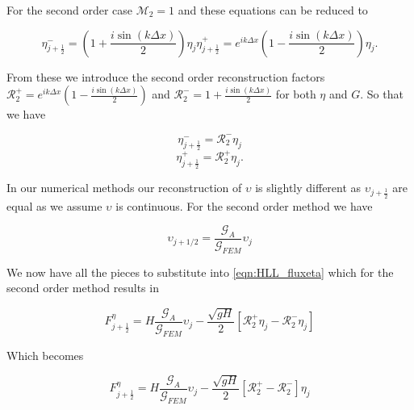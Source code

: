 \documentclass[12pt]{article}
\begin{document}
For the second order case $\mathcal{M}_2 = 1$ and these equations can be reduced to 

\begin{subequations}
	\label{eqn:2ndrecon}
	\begin{equation}
	\eta^-_{j+\frac{1}{2}} = \left(1  + \frac{i\sin\left(k\Delta x\right)}{2} \right){\eta}_j
	\end{equation}
	\begin{equation}
	\eta^+_{j+\frac{1}{2}} = e^{ik\Delta x}\left(1  - \frac{i\sin\left(k\Delta x\right)}{2} \right){\eta}_{j}.
	\end{equation}
\end{subequations}

From these we introduce the second order reconstruction factors $\mathcal{R}^+_2 = e^{ik\Delta x}\left(1  - \frac{i\sin\left(k\Delta x\right)}{2} \right)$ and $\mathcal{R}^-_2 = 1  + \frac{i\sin\left(k\Delta x\right)}{2}$ for both $\eta$ and $G$. So that we have 

\begin{equation*}
\eta^-_{j+\frac{1}{2}} = \mathcal{R}^-_2 {\eta}_j
\end{equation*}
\begin{equation*}
\eta^+_{j+\frac{1}{2}} = \mathcal{R}^+_2{\eta}_{j}.
\end{equation*}

In our numerical methods our reconstruction of $\upsilon$ is slightly different as $\upsilon_{j+\frac{1}{2}}$ are equal as we assume $\upsilon$ is continuous. For the second order method we have

\begin{equation*}
\upsilon_{j + 1/2} =   \frac{\mathcal{G}_{A}}{\mathcal{G}_{FEM}} \upsilon_j
\end{equation*}

We now have all the pieces to substitute into \eqref{eqn:HLL_fluxeta} which for the second order method results in

\begin{equation*}
F^{\eta}_{j+\frac{1}{2}} =  H  \frac{\mathcal{G}_{A}}{\mathcal{G}_{FEM}} \upsilon_j  - \dfrac{ \sqrt{gH}}{ 2} \left [  \mathcal{R}^+_2 {\eta}_j -  \mathcal{R}^-_2 {\eta}_j \right ]
\end{equation*}

Which becomes

\begin{equation*}
F^{\eta}_{j+\frac{1}{2}} = H \frac{\mathcal{G}_{A}}{\mathcal{G}_{FEM}} \upsilon_j  - \dfrac{ \sqrt{gH}}{ 2} \left [  \mathcal{R}^+_2 -  \mathcal{R}^-_2 \right ] {\eta}_j
\end{equation*}
\end{document}
